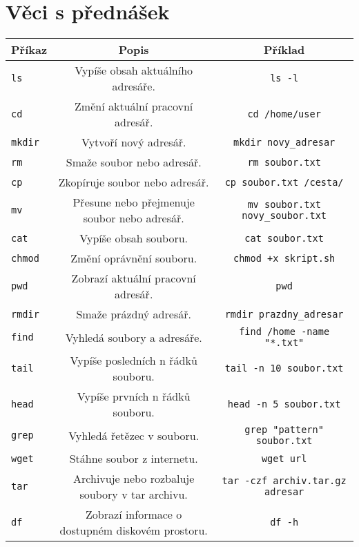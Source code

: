 \documentclass{article}
\begin{document}
\section{Věci s přednášek}
\begin{center}
\begin{tabular}{|l|c|c|}
\hline
\textbf{Příkaz} & \textbf{Popis} & \textbf{Příklad} \\
\hline
\texttt{ls} & Vypíše obsah aktuálního adresáře. & \texttt{ls -l} \\
\hline
\texttt{cd} & Změní aktuální pracovní adresář. & \texttt{cd /home/user} \\
\hline
\texttt{mkdir} & Vytvoří nový adresář. & \texttt{mkdir novy\_adresar} \\
\hline
\texttt{rm} & Smaže soubor nebo adresář. & \texttt{rm soubor.txt} \\
\hline
\texttt{cp} & Zkopíruje soubor nebo adresář. & \texttt{cp soubor.txt /cesta/} \\
\hline
\texttt{mv} & Přesune nebo přejmenuje soubor nebo adresář. & \texttt{mv soubor.txt novy\_soubor.txt} \\
\hline
\texttt{cat} & Vypíše obsah souboru. & \texttt{cat soubor.txt} \\
\hline
\texttt{chmod} & Změní oprávnění souboru. & \texttt{chmod +x skript.sh} \\
\hline
\texttt{pwd} & Zobrazí aktuální pracovní adresář. & \texttt{pwd} \\
\hline
\texttt{rmdir} & Smaže prázdný adresář. & \texttt{rmdir prazdny\_adresar} \\
\hline
\texttt{find} & Vyhledá soubory a adresáře. & \texttt{find /home -name "*.txt"} \\
\hline
\texttt{tail} & Vypíše posledních n řádků souboru. & \texttt{tail -n 10 soubor.txt} \\
\hline
\texttt{head} & Vypíše prvních n řádků souboru. & \texttt{head -n 5 soubor.txt} \\
\hline
\texttt{grep} & Vyhledá řetězec v souboru. & \texttt{grep "pattern" soubor.txt} \\
\hline
\texttt{wget} & Stáhne soubor z internetu. & \texttt{wget url} \\
\hline
\texttt{tar} & Archivuje nebo rozbaluje soubory v tar archivu. & \texttt{tar -czf archiv.tar.gz adresar} \\
\hline
\texttt{df} & Zobrazí informace o dostupném diskovém prostoru. & \texttt{df -h} \\
\hline
\end{tabular}
\end{center}
\end{document}
